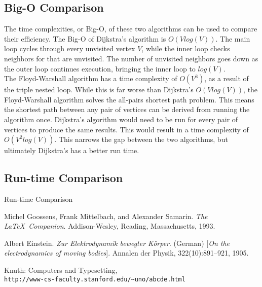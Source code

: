 \documentclass[]{article}
\newcommand\tab[1][1cm]{\hspace*{#1}}
\begin{document}
	\subsection{Big-O Comparison}
	\tab The time complexities, or Big-O, of these two algorithms can be used to compare their efficiency. The Big-O of Dijkstra's algorithm is $O\left(Vlog\left(V\right)\right)$. The main loop cycles through every unvisited vertex $V$, while the inner loop checks neighbors for that are unvisited. The number of unvisited neighbors goes down as the outer loop continues execution, bringing the inner loop to $log\left(V\right)$.\\
	\tab The Floyd-Warshall algorithm has a time complexity of $O\left(V^{3}\right)$, as a result of the triple nested loop. While this is far worse than Dijkstra's $O\left(Vlog\left(V\right)\right)$, the Floyd-Warshall algorithm solves the all-pairs shortest path problem. This means the shortest path between any pair of vertices can be derived from running the algorithm once. Dijkstra's algorithm would need to be run for every pair of vertices to produce the same results. This would result in a time complexity of $O\left(V^{2}log\left(V\right)\right)$. This narrows the gap between the two algorithms, but ultimately Dijkstra's has a better run time. 
	
	\subsection{Run-time Comparison}
	Run-time Comparison
	
	\begin{thebibliography}{9}
		Michel Goossens, Frank Mittelbach, and Alexander Samarin. 
		\textit{The \LaTeX\ Companion}. 
		Addison-Wesley, Reading, Massachusetts, 1993.
		
		Albert Einstein. 
		\textit{Zur Elektrodynamik bewegter K{\"o}rper}. (German) 
		[\textit{On the electrodynamics of moving bodies}]. 
		Annalen der Physik, 322(10):891–921, 1905.
		
		Knuth: Computers and Typesetting,
		\\\texttt{http://www-cs-faculty.stanford.edu/\~{}uno/abcde.html}
	\end{thebibliography}
\end{document}
